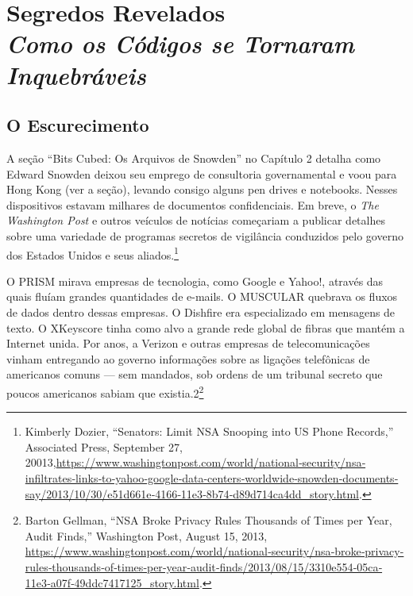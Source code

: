 \documentclass{book}
\newcommand{\ingles}[1]{\textit{#1}}
\begin{document}

\chapter[Segredos Revelados]{Segredos Revelados\\\large\textit{Como os Códigos se Tornaram Inquebráveis}}
\label{segredos}


\section{O Escurecimento} %
\label{segredos:desaparecendo}

A seção ``Bits Cubed: Os Arquivos de Snowden'' no Capítulo 2 detalha como Edward Snowden deixou seu emprego de consultoria governamental e voou para Hong Kong (ver a seção), levando consigo alguns pen drives e notebooks. Nesses dispositivos estavam milhares de documentos confidenciais. Em breve, o \ingles{The Washington Post} e outros veículos de notícias começariam a publicar detalhes sobre uma variedade de programas secretos de vigilância conduzidos pelo governo dos Estados Unidos e seus aliados.\footnote{Kimberly Dozier, “Senators: Limit NSA Snooping into US Phone Records,” Associated Press, September 27, 20013,\url{https://www.washingtonpost.com/world/national‐security/nsa‐infiltrates‐links‐to‐yahoo‐google‐data-centers‐worldwide‐snowden‐documents‐say/2013/10/30/e51d661e‐4166‐11e3‐8b74‐d89d714ca4dd_story.html}.}

O PRISM mirava empresas de tecnologia, como Google e Yahoo!, através das quais fluíam grandes quantidades de e-mails. O MUSCULAR quebrava os fluxos de dados dentro dessas empresas. O Dishfire era especializado em mensagens de texto. O XKeyscore tinha como alvo a grande rede global de fibras que mantém a Internet unida. Por anos, a Verizon e outras empresas de telecomunicações vinham entregando ao governo informações sobre as ligações telefônicas de americanos comuns --- sem mandados, sob ordens de um tribunal secreto que poucos americanos sabiam que existia.2\footnote{Barton Gellman, “NSA Broke Privacy Rules Thousands of Times per Year, Audit Finds,” Washington Post, August 15, 2013, \url{ https://www.washingtonpost.com/world/national‐security/nsa‐broke‐privacy-rules‐thousands‐of‐times‐per‐year‐audit‐finds/2013/08/15/3310e554‐05ca‐11e3‐a07f‐49ddc7417125_story.html}.}
\end{document}
